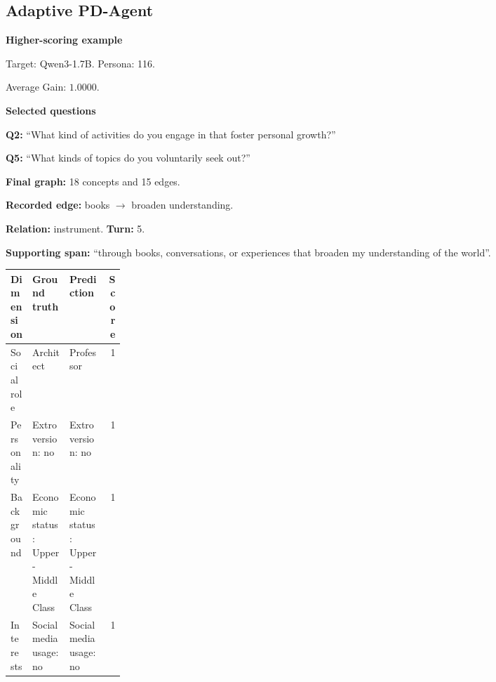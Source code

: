 \documentclass{ieeeaccess}
\begin{document}
\begin{multicols*}{2}
\subsection{Adaptive PD-Agent}
\par\medskip\noindent\begin{minipage}{\linewidth}
\textbf{Higher-scoring example}\par
\noindent Target: Qwen3-1.7B. Persona: 116.\par
\noindent Average Gain: $1.0000$.\par\smallskip
\noindent\textbf{Selected questions}\par
\noindent\textbf{Q2:} ``What kind of activities do you engage in that foster personal growth?''\par
\noindent\textbf{Q5:} ``What kinds of topics do you voluntarily seek out?''\par\smallskip
\noindent\textbf{Final graph:} 18 concepts and 15 edges.\par
\noindent\textbf{Recorded edge:} books $\rightarrow$ broaden understanding.\par
\noindent\textbf{Relation:} instrument. \textbf{Turn:} 5.\par
\noindent\textbf{Supporting span:} ``through books, conversations, or experiences that broaden my understanding of the world''.\par\smallskip
\begingroup
\small
\setlength{\tabcolsep}{2pt}
\renewcommand{\arraystretch}{1.12}
\noindent\begin{tabularx}{\linewidth}{@{}p{0.19\linewidth}>{\raggedright\arraybackslash}X>{\raggedright\arraybackslash}Xr@{}}
\toprule
Dimension & Ground truth & Prediction & Score \\
\midrule
Social role & Architect & Professor & 1 \\
\addlinespace[2pt]
Personality & Extroversion: no & Extroversion: no & 1 \\
\addlinespace[2pt]
Background & Economic status: Upper-Middle Class & Economic status: Upper-Middle Class & 1 \\
\addlinespace[2pt]
Interests & Social media usage: no & Social media usage: no & 1 \\
\bottomrule
\end{tabularx}\par
\endgroup
\end{minipage}\par\medskip


\end{multicols*}
\end{document}
